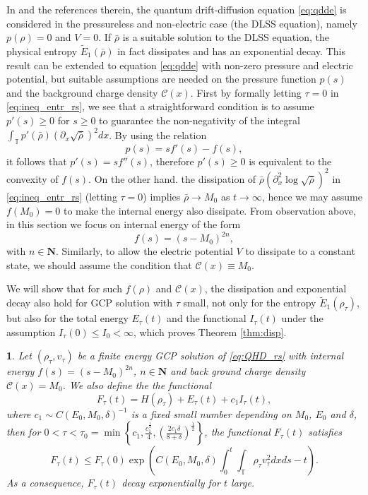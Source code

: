 \documentclass[leqno]{amsart}
\theoremstyle{plain}
\theoremstyle{definition}
\theoremstyle{remark}
\theoremstyle{plain}
\theoremstyle{plain}
\newtheorem{prop}[thm]{\protect\propositionname}
\providecommand{\propositionname}{Proposition}
\def\T{{\mathbb T}}%
\def\N{{\mathbf N}}%
\def\d{{\partial}}
\numberwithin{equation}{section}
\begin{document}
In \cite{JM} and the references therein, the quantum drift-diffusion equation \eqref{eq:qdde} is considered in the pressureless and non-electric case (the DLSS equation), namely $p(\rho)=0$ and $V=0$. If $\bar\rho$ is a suitable solution to the DLSS equation, the physical entropy $\tilde E_{1}(\bar\rho)$ in fact dissipates and has an exponential decay. This result can be extended to equation \eqref{eq:qdde} with non-zero pressure and electric potential, but suitable assumptions are needed on the pressure function $p(s)$ and the background charge density $\mathcal{C}(x)$. First by formally letting $\tau=0$ in \eqref{eq:ineq_entr_rs}, we see that a straightforward condition is to assume $p'(s)\geq 0$ for $s\geq 0$ to guarantee the non-negativity of the integral $\int_\T p'(\bar\rho)(\d_x\sqrt{\bar\rho})^2dx$. By using the relation
\[
p(s)=s f'(s)-f(s),
\]
it follows that $p'(s)=s f''(s)$, therefore $p'(s)\geq 0$ is equivalent to the convexity of $f(s)$. On the other hand. the dissipation of $\bar\rho(\d_x^2\log\sqrt{\bar\rho})^2$ in \eqref{eq:ineq_entr_rs} (letting $\tau=0$) implies $\bar\rho\to M_0$ as $t\to\infty$, hence we may assume $f(M_0)=0$ to make the internal energy also dissipate. From observation above, in this section we focus on internal energy of the form
\[
f(s)=(s-M_0)^{2n},
\] 
with $n\in\N$. Similarly, to allow the electric potential $V$ to dissipate to a constant state, we should assume the condition that $\mathcal{C}(x)\equiv M_0$.

We will show that for such $f(\rho)$ and $\mathcal{C}(x)$, the dissipation and exponential decay also hold for GCP solution with $\tau$ small, not only for the entropy $\tilde E_{1}(\rho_\tau)$, but also for the total energy $E_\tau(t)$ and the functional $I_\tau(t)$ under the assumption $I_\tau(0)\leq I_0<\infty$, which proves Theorem \ref{thm:disp}.

\begin{prop}\label{prop:decay}
Let $(\rho_\tau, v_\tau)$ be a finite energy GCP solution of \eqref{eq:QHD_rs} with internal energy $f(s)=(s-M_0)^{2n}$, $n\in\N$ and back ground charge density $\mathcal{C}(x)=M_0$. We also define the the functional
\[
F_\tau(t)=H(\rho_\tau)+ E_\tau(t)+c_1 I_\tau(t),
\]
where $ c_1\sim C(E_0,M_0,\delta)^{-1}$ is a fixed small number depending on $M_0$, $E_0$ and $\delta$, then for $0<\tau<\tau_0=\min\left\{c_1,\frac{c_1^\frac12}{4},\left(\frac{2c_1\delta}{8+\delta}\right)^\frac12\right\}$, the functional $F_\tau(t)$ satisfies
\begin{equation}\label{eq:decay}
F_\tau(t)\leq F_\tau(0)\exp\left(C(E_0,M_0,\delta)\int_0^t\int_\T\rho_\tau v_\tau^2dxds- t\right).
\end{equation}
As a consequence, $F_\tau(t)$ decay exponentially for $t$ large.
\end{prop}
\end{document}
